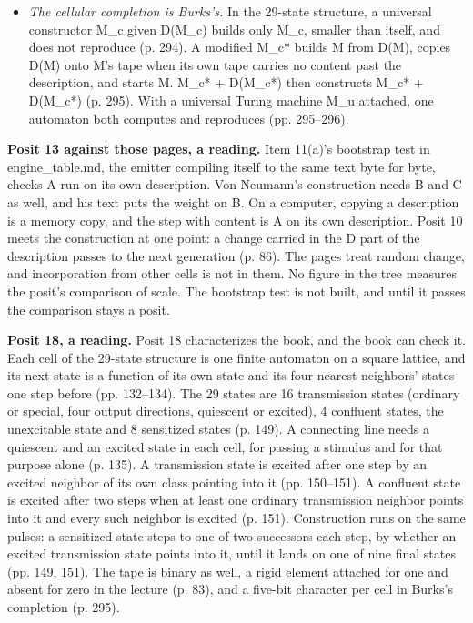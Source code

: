 \begin{itemize}
\item \emph{The cellular completion is Burks's.} In the 29-state structure, a universal constructor M\_\allowbreak{}c given D(M\_\allowbreak{}c) builds only M\_\allowbreak{}c, smaller than itself, and does not reproduce (p. 294). A modified M\_\allowbreak{}c* builds M from D(M), copies D(M) onto M's tape when its own tape carries no content past the description, and starts M. M\_\allowbreak{}c* + D(M\_\allowbreak{}c*) then constructs M\_\allowbreak{}c* + D(M\_\allowbreak{}c*) (p. 295). With a universal Turing machine M\_\allowbreak{}u attached, one automaton both computes and reproduces (pp. 295–296).
\end{itemize}

\textbf{Posit 13 against those pages, a reading.} Item 11(a)'s bootstrap test in engine\_\allowbreak{}table.md, the emitter compiling itself to the same text byte for byte, checks A run on its own description. Von Neumann's construction needs B and C as well, and his text puts the weight on B. On a computer, copying a description is a memory copy, and the step with content is A on its own description. Posit 10 meets the construction at one point: a change carried in the D part of the description passes to the next generation (p. 86). The pages treat random change, and incorporation from other cells is not in them. No figure in the tree measures the posit's comparison of scale. The bootstrap test is not built, and until it passes the comparison stays a posit.

\textbf{Posit 18, a reading.} Posit 18 characterizes the book, and the book can check it. Each cell of the 29-state structure is one finite automaton on a square lattice, and its next state is a function of its own state and its four nearest neighbors' states one step before (pp. 132–134). The 29 states are 16 transmission states (ordinary or special, four output directions, quiescent or excited), 4 confluent states, the unexcitable state and 8 sensitized states (p. 149). A connecting line needs a quiescent and an excited state in each cell, for passing a stimulus and for that purpose alone (p. 135). A transmission state is excited after one step by an excited neighbor of its own class pointing into it (pp. 150–151). A confluent state is excited after two steps when at least one ordinary transmission neighbor points into it and every such neighbor is excited (p. 151). Construction runs on the same pulses: a sensitized state steps to one of two successors each step, by whether an excited transmission state points into it, until it lands on one of nine final states (pp. 149, 151). The tape is binary as well, a rigid element attached for one and absent for zero in the lecture (p. 83), and a five-bit character per cell in Burks's completion (p. 295).


